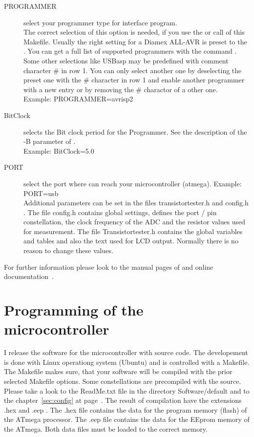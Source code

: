 \begin{description}
\label{sec:config-Prog}
  \item[PROGRAMMER] select your programmer type for  interface program.\\
The correct selection of this option is needed, if you use the  or  call
of this Makefile.
Usually the right setting for a Diamex ALL-AVR is preset to the . You can get a full list
of supported programmers with the command . Some other selections like USBasp may be 
predefined with comment character \# in row 1. You can only select another one by deselecting the
preset one with the \# character in row 1 and enable another programmer with a new entry or by
removing the \# charactor of a other one.\\
Example: PROGRAMMER=avrisp2

  \item[BitClock] selects the Bit clock period for the Programmer. See the description of the -B parameter of .\\
Example: BitClock=5.0
  \item[PORT] select the port where  can reach your microcontroller (atmega).
Example: PORT=usb\\

Additional parameters can be set in the files transistortester.h and config.h .
The file config.h contains global settings, defines the port / pin constellation,
 the clock frequency of the ADC and the resistor values used for measurement.
The file Transistortester.h contains the global variables and tables and also the text used for LCD output.
Normally there is no reason to change these values.
\end{description}
For further information please look to the manual pages of  and online documentation~\cite{avrdude}.

\section{Programming of the microcontroller}

I release the software for the microcontroller with source code.
The developement is done with Linux operationg system (Ubuntu) and
is controlled with a Makefile. The Makefile makes sure, that your
software will be compiled with the prior selected Makefile options. Some constellations
are precompiled with the source. Please take a look to the ReadMe.txt file
in the directory Software/default and to the chapter~\ref{sec:config} at page~\pageref{sec:config}.
The result of compilation have the extensions .hex and .eep .
The .hex file contains the data for the program memory (flash) of the ATmega processor.
The .eep file contains the data for the EEprom memory of the ATmega. Both data files
must be loaded to the correct memory.

